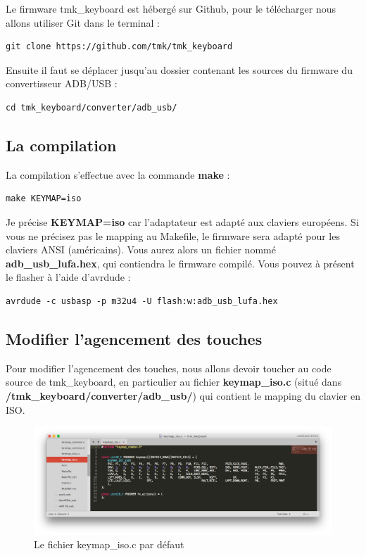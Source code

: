 \documentclass[12pt,a4paper,final]{article}
\begin{document}
Le firmware tmk\_keyboard est hébergé sur Github, pour le télécharger nous allons utiliser Git dans le terminal :

\begin{verbatim}
git clone https://github.com/tmk/tmk_keyboard
\end{verbatim}

Ensuite il faut se déplacer jusqu'au dossier contenant les sources du firmware du convertisseur ADB/USB :

\begin{verbatim}
cd tmk_keyboard/converter/adb_usb/
\end{verbatim}

\subsection{La compilation}

La compilation s'effectue avec la commande \textbf{make} :

\begin{verbatim}
make KEYMAP=iso
\end{verbatim}

Je précise \textbf{KEYMAP=iso} car l'adaptateur est adapté aux claviers européens. Si vous ne précisez pas le mapping au Makefile, le firmware sera adapté pour les claviers ANSI (américains).
Vous aurez alors un fichier nommé \textbf{adb\_usb\_lufa.hex}, qui contiendra le firmware compilé. Vous pouvez à présent le flasher à l'aide d'avrdude :

\begin{verbatim}
avrdude -c usbasp -p m32u4 -U flash:w:adb_usb_lufa.hex
\end{verbatim}

\subsection{Modifier l'agencement des touches}

Pour modifier l'agencement des touches, nous allons devoir toucher au code source de tmk\_keyboard, en particulier au fichier \textbf{keymap\_iso.c} (situé dans \textbf{/tmk\_keyboard/converter/adb\_usb/}) qui contient le mapping du clavier en ISO.

\begin{figure}[h]
    \centering
    \includegraphics[width=14cm]{keymap_iso.png}
    \caption{Le fichier keymap\_iso.c par défaut}
    \label{fig:4}
\end{figure}
\end{document}
